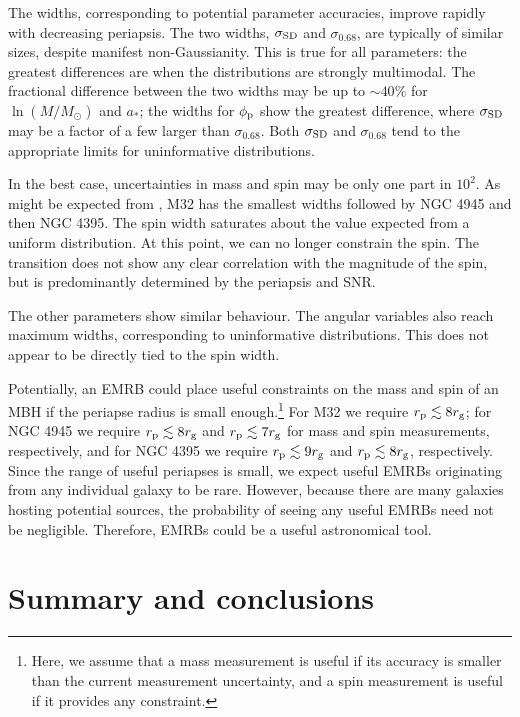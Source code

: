 The widths, corresponding to potential parameter accuracies, improve rapidly with decreasing periapsis. The two widths, $\sigma_\mathrm{SD}$ and $\sigma_{0.68}$, are typically of similar sizes, despite manifest non-Gaussianity. This is true for all parameters: the greatest differences are when the distributions are strongly multimodal. The fractional difference between the two widths may be up to $\sim 40\%$ for $\ln(M/M_\odot)$ and $a_\ast$; the widths for $\phi_\mathrm{p}$ show the greatest difference, where $\sigma_\mathrm{SD}$ may be a factor of a few larger than $\sigma_{0.68}$. Both $\sigma_\mathrm{SD}$ and $\sigma_{0.68}$ tend to the appropriate limits for uninformative distributions.

In the best case, uncertainties in mass and spin may be only one part in $10^2$. As might be expected from , M32 has the smallest widths followed by NGC 4945 and then NGC 4395. The spin width saturates about the value expected from a uniform distribution. At this point, we can no longer constrain the spin. The transition does not show any clear correlation with the magnitude of the spin, but is predominantly determined by the periapsis and SNR.

The other parameters show similar behaviour. The angular variables also reach maximum widths, corresponding to uninformative distributions. This does not appear to be directly tied to the spin width.

Potentially, an EMRB could place useful constraints on the mass and spin of an MBH if the periapse radius is small enough.\footnote{Here, we assume that a mass measurement is useful if its accuracy is smaller than the current measurement uncertainty, and a spin measurement is useful if it provides any constraint.} For M32 we require $r_\mathrm{p} \lesssim 8 r_\mathrm{g}$; for NGC 4945 we require $r_\mathrm{p} \lesssim 8 r_\mathrm{g}$ and $r_\mathrm{p} \lesssim 7 r_\mathrm{g}$ for mass and spin measurements, respectively, and for NGC 4395 we require $r_\mathrm{p} \lesssim 9 r_\mathrm{g}$ and $r_\mathrm{p} \lesssim 8 r_\mathrm{g}$, respectively. Since the range of useful periapses is small, we expect useful EMRBs originating from any individual galaxy to be rare. However, because there are many galaxies hosting potential sources, the probability of seeing any useful EMRBs need not be negligible. Therefore, EMRBs could be a useful astronomical tool.

\section{Summary and conclusions}\label{sec:extragal-End}

